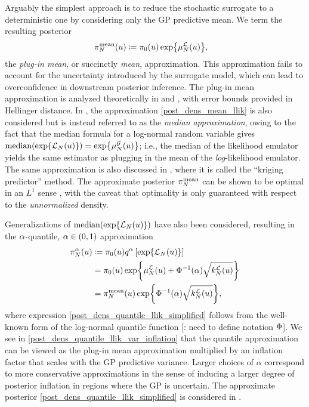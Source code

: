 \documentclass[12pt]{article}
\begin{document}
Arguably the simplest approach is to reduce the stochastic surrogate to a deterministic 
one by considering only the GP predictive mean. We term the resulting posterior
\begin{align}
\llikEmMeanDens[\Ndesign](\Par) &\Def \priorDens(\Par) \Exp{\emMean[\Ndesign]{\llik}(\Par)} 
\label{post_dens_mean_llik},
\end{align}
the \textit{plug-in mean}, or succinctly \textit{mean}, approximation. 
This approximation fails to account for the uncertainty introduced by the surrogate model, which can lead 
to overconfidence in downstream posterior inference. The plug-in mean approximation 
is analyzed theoretically in \cite{StuartTeck1} and \cite{gp_surrogates_random_exploration}, 
with error bounds provided in Hellinger distance. In \cite{VehtariParallelGP}, 
the approximation \ref{post_dens_mean_llik} is also considered but is instead referred to as the 
\textit{median approximation}, owing to the fact that the median formula for a log-normal random variable 
gives $\text{median}(\Exp{\llikEm[\Ndesign](\Par)}) = \Exp{\emMean[\Ndesign]{\fwd}(\Par)}$; 
i.e., the median of the likelihood emulator yields the same estimator as plugging in the mean of the 
\textit{log}-likelihood emulator. The same approximation is also discussed in \citet{trainDynamics}, where
it is called the ``kriging predictor'' method.
The approximate posterior $\llikEmMeanDens[\Ndesign]$ can be 
shown to be optimal in an $L^1$ sense \citep{VehtariParallelGP, StuartTeck2}, with the caveat that 
optimality is only guaranteed with respect to the \textit{unnormalized} density.

Generalizations of $\text{median}(\Exp{\llikEm[\Ndesign](\Par)})$ have also been considered, resulting 
in the $\quantileProb$-quantile, $\quantileProb \in (0,1)$ approximation
\begin{align}
\llikEmQDens[\Ndesign](\Par) 
&\Def \priorDens(\Par) \quantile \left[\Exp{\llikEm[\Ndesign](\Par)} \right] \label{post_dens_quantile_llik} \\
&= \priorDens(\Par) \Exp{\emMean[\Ndesign]{\llik}(\Par) + \GaussianCDF^{-1}(\quantileProb) \sqrt{\emKer[\Ndesign]{\llik}(\Par)}} 
\label{post_dens_quantile_llik_simplified} \\
&= \llikEmMeanDens[\Ndesign](\Par) \Exp{\GaussianCDF^{-1}(\quantileProb) \sqrt{\emKer[\Ndesign]{\llik}(\Par)}},
\label{post_dens_quantile_llik_var_inflation}
\end{align}
where expression \ref{post_dens_quantile_llik_simplified} follows from the well-known form of the log-normal 
quantile function [\todo: need to define notation $\GaussianCDF$]. 
We see in \ref{post_dens_quantile_llik_var_inflation} that the quantile approximation can 
be viewed as the plug-in mean approximation multiplied by an inflation factor that scales with the GP predictive 
variance. Larger choices of $\alpha$ correspond to more conservative approximations in the sense of inducing 
a larger degree of posterior inflation in regions where the GP is uncertain. The approximate posterior 
\ref{post_dens_quantile_llik_simplified} is considered in \citep{VehtariParallelGP, quantileApprox}.
\end{document}
